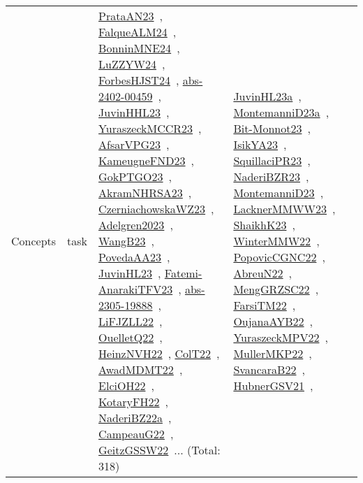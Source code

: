 {\begin{longtable}{lp{3cm}>{\raggedright\arraybackslash}p{6cm}>{\raggedright\arraybackslash}p{6cm}>{\raggedright\arraybackslash}p{8cm}}
Concepts & task & \href{../works/PrataAN23.pdf}{PrataAN23}~\cite{PrataAN23}, \href{../works/FalqueALM24.pdf}{FalqueALM24}~\cite{FalqueALM24}, \href{../works/BonninMNE24.pdf}{BonninMNE24}~\cite{BonninMNE24}, \href{../works/LuZZYW24.pdf}{LuZZYW24}~\cite{LuZZYW24}, \href{../works/ForbesHJST24.pdf}{ForbesHJST24}~\cite{ForbesHJST24}, \href{../works/abs-2402-00459.pdf}{abs-2402-00459}~\cite{abs-2402-00459}, \href{../works/JuvinHHL23.pdf}{JuvinHHL23}~\cite{JuvinHHL23}, \href{../works/YuraszeckMCCR23.pdf}{YuraszeckMCCR23}~\cite{YuraszeckMCCR23}, \href{../works/AfsarVPG23.pdf}{AfsarVPG23}~\cite{AfsarVPG23}, \href{../works/KameugneFND23.pdf}{KameugneFND23}~\cite{KameugneFND23}, \href{../works/GokPTGO23.pdf}{GokPTGO23}~\cite{GokPTGO23}, \href{../works/AkramNHRSA23.pdf}{AkramNHRSA23}~\cite{AkramNHRSA23}, \href{../works/CzerniachowskaWZ23.pdf}{CzerniachowskaWZ23}~\cite{CzerniachowskaWZ23}, \href{../works/Adelgren2023.pdf}{Adelgren2023}~\cite{Adelgren2023}, \href{../works/WangB23.pdf}{WangB23}~\cite{WangB23}, \href{../works/PovedaAA23.pdf}{PovedaAA23}~\cite{PovedaAA23}, \href{../works/JuvinHL23.pdf}{JuvinHL23}~\cite{JuvinHL23}, \href{../works/Fatemi-AnarakiTFV23.pdf}{Fatemi-AnarakiTFV23}~\cite{Fatemi-AnarakiTFV23}, \href{../works/abs-2305-19888.pdf}{abs-2305-19888}~\cite{abs-2305-19888}, \href{../works/LiFJZLL22.pdf}{LiFJZLL22}~\cite{LiFJZLL22}, \href{../works/OuelletQ22.pdf}{OuelletQ22}~\cite{OuelletQ22}, \href{../works/HeinzNVH22.pdf}{HeinzNVH22}~\cite{HeinzNVH22}, \href{../works/ColT22.pdf}{ColT22}~\cite{ColT22}, \href{../works/AwadMDMT22.pdf}{AwadMDMT22}~\cite{AwadMDMT22}, \href{../works/ElciOH22.pdf}{ElciOH22}~\cite{ElciOH22}, \href{../works/KotaryFH22.pdf}{KotaryFH22}~\cite{KotaryFH22}, \href{../works/NaderiBZ22a.pdf}{NaderiBZ22a}~\cite{NaderiBZ22a}, \href{../works/CampeauG22.pdf}{CampeauG22}~\cite{CampeauG22}, \href{../works/GeitzGSSW22.pdf}{GeitzGSSW22}~\cite{GeitzGSSW22}... (Total: 318) & \href{../works/JuvinHL23a.pdf}{JuvinHL23a}~\cite{JuvinHL23a}, \href{../works/MontemanniD23a.pdf}{MontemanniD23a}~\cite{MontemanniD23a}, \href{../works/Bit-Monnot23.pdf}{Bit-Monnot23}~\cite{Bit-Monnot23}, \href{../works/IsikYA23.pdf}{IsikYA23}~\cite{IsikYA23}, \href{../works/SquillaciPR23.pdf}{SquillaciPR23}~\cite{SquillaciPR23}, \href{../works/NaderiBZR23.pdf}{NaderiBZR23}~\cite{NaderiBZR23}, \href{../works/MontemanniD23.pdf}{MontemanniD23}~\cite{MontemanniD23}, \href{../works/LacknerMMWW23.pdf}{LacknerMMWW23}~\cite{LacknerMMWW23}, \href{../works/ShaikhK23.pdf}{ShaikhK23}~\cite{ShaikhK23}, \href{../works/WinterMMW22.pdf}{WinterMMW22}~\cite{WinterMMW22}, \href{../works/PopovicCGNC22.pdf}{PopovicCGNC22}~\cite{PopovicCGNC22}, \href{../works/AbreuN22.pdf}{AbreuN22}~\cite{AbreuN22}, \href{../works/MengGRZSC22.pdf}{MengGRZSC22}~\cite{MengGRZSC22}, \href{../works/FarsiTM22.pdf}{FarsiTM22}~\cite{FarsiTM22}, \href{../works/OujanaAYB22.pdf}{OujanaAYB22}~\cite{OujanaAYB22}, \href{../works/YuraszeckMPV22.pdf}{YuraszeckMPV22}~\cite{YuraszeckMPV22}, \href{../works/MullerMKP22.pdf}{MullerMKP22}~\cite{MullerMKP22}, \href{../works/SvancaraB22.pdf}{SvancaraB22}~\cite{SvancaraB22}, \href{../works/HubnerGSV21.pdf}{HubnerGSV21}~\cite{HubnerGSV21}, 
\end{longtable}}
